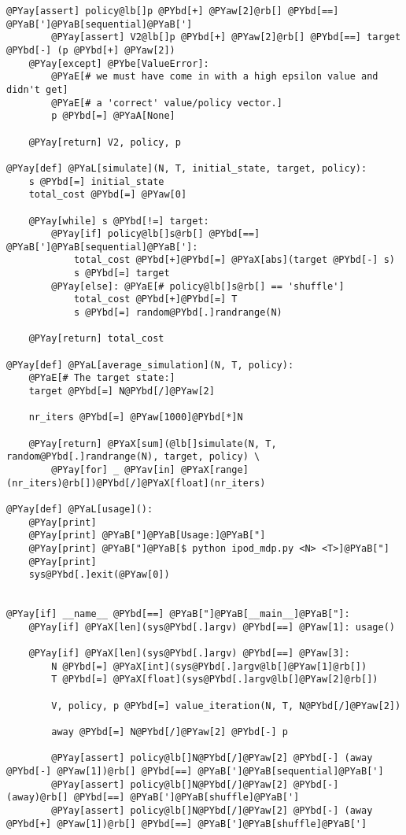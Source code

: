 \begin{Verbatim}[commandchars=@\[\]]
        @PYay[assert] policy@lb[]p @PYbd[+] @PYaw[2]@rb[] @PYbd[==] @PYaB[']@PYaB[sequential]@PYaB[']
        @PYay[assert] V2@lb[]p @PYbd[+] @PYaw[2]@rb[] @PYbd[==] target @PYbd[-] (p @PYbd[+] @PYaw[2])
    @PYay[except] @PYbe[ValueError]:
        @PYaE[# we must have come in with a high epsilon value and didn't get]
        @PYaE[# a 'correct' value/policy vector.]
        p @PYbd[=] @PYaA[None]

    @PYay[return] V2, policy, p

@PYay[def] @PYaL[simulate](N, T, initial_state, target, policy):
    s @PYbd[=] initial_state
    total_cost @PYbd[=] @PYaw[0]

    @PYay[while] s @PYbd[!=] target:
        @PYay[if] policy@lb[]s@rb[] @PYbd[==] @PYaB[']@PYaB[sequential]@PYaB[']:
            total_cost @PYbd[+]@PYbd[=] @PYaX[abs](target @PYbd[-] s)
            s @PYbd[=] target
        @PYay[else]: @PYaE[# policy@lb[]s@rb[] == 'shuffle']
            total_cost @PYbd[+]@PYbd[=] T
            s @PYbd[=] random@PYbd[.]randrange(N)

    @PYay[return] total_cost

@PYay[def] @PYaL[average_simulation](N, T, policy):
    @PYaE[# The target state:]
    target @PYbd[=] N@PYbd[/]@PYaw[2]

    nr_iters @PYbd[=] @PYaw[1000]@PYbd[*]N

    @PYay[return] @PYaX[sum](@lb[]simulate(N, T, random@PYbd[.]randrange(N), target, policy) \
        @PYay[for] _ @PYav[in] @PYaX[range](nr_iters)@rb[])@PYbd[/]@PYaX[float](nr_iters)

@PYay[def] @PYaL[usage]():
    @PYay[print]
    @PYay[print] @PYaB["]@PYaB[Usage:]@PYaB["]
    @PYay[print] @PYaB["]@PYaB[$ python ipod_mdp.py <N> <T>]@PYaB["]
    @PYay[print]
    sys@PYbd[.]exit(@PYaw[0])


@PYay[if] __name__ @PYbd[==] @PYaB["]@PYaB[__main__]@PYaB["]:
    @PYay[if] @PYaX[len](sys@PYbd[.]argv) @PYbd[==] @PYaw[1]: usage()

    @PYay[if] @PYaX[len](sys@PYbd[.]argv) @PYbd[==] @PYaw[3]:
        N @PYbd[=] @PYaX[int](sys@PYbd[.]argv@lb[]@PYaw[1]@rb[]) 
        T @PYbd[=] @PYaX[float](sys@PYbd[.]argv@lb[]@PYaw[2]@rb[]) 

        V, policy, p @PYbd[=] value_iteration(N, T, N@PYbd[/]@PYaw[2])

        away @PYbd[=] N@PYbd[/]@PYaw[2] @PYbd[-] p

        @PYay[assert] policy@lb[]N@PYbd[/]@PYaw[2] @PYbd[-] (away @PYbd[-] @PYaw[1])@rb[] @PYbd[==] @PYaB[']@PYaB[sequential]@PYaB[']
        @PYay[assert] policy@lb[]N@PYbd[/]@PYaw[2] @PYbd[-] (away)@rb[] @PYbd[==] @PYaB[']@PYaB[shuffle]@PYaB[']
        @PYay[assert] policy@lb[]N@PYbd[/]@PYaw[2] @PYbd[-] (away @PYbd[+] @PYaw[1])@rb[] @PYbd[==] @PYaB[']@PYaB[shuffle]@PYaB[']


\end{Verbatim}
